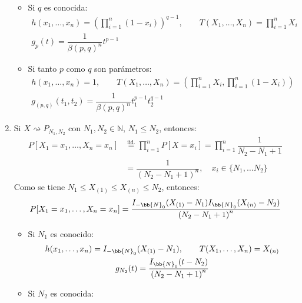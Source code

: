 \begin{ejercicio}
\begin{enumerate}[label=\alph*)]
\begin{itemize}
\begin{gather*}
                    \end{gather*}
                \item Si $q$ es conocida:
                    \begin{gather*}
                        h(x_1, \ldots, x_n) = {\left(\prod_{i=1}^{n}(1-x_i)\right)}^{q-1}, \qquad T(X_1, \ldots, X_n) = \prod_{i=1}^{n}X_i \\
                        g_p(t) = \dfrac{1}{{\beta(p,q)}^{n}} t^{p-1}
                    \end{gather*}
                \item Si tanto $p$ como $q$ son parámetros:
                    \begin{gather*}
                        h(x_1, \ldots, x_n) = 1, \qquad T(X_1, \ldots, X_n) = \left(\prod_{i=1}^{n}X_i, \prod_{i=1}^{n}(1-X_i)\right) \\
                        g_{(p,q)}(t_1, t_2) = \dfrac{1}{{\beta(p,q)}^{n}}t_1^{p-1}t_2^{q-1}
                    \end{gather*}
            \end{itemize}
        \item Si $X\rightsquigarrow P_{N_1,N_2}$ con $N_1,N_2\in \mathbb{N}$, $N_1\leq N_2$, entonces:
            \begin{align*}
                P[X_1=x_1, \ldots, X_n=x_n]&\stackrel{\text{iid.}}{=} \prod_{i=1}^{n} P[X=x_i] =\prod_{i=1}^{n} \dfrac{1}{N_2-N_1+1} \\
                                           &= \dfrac{1}{{(N_2-N_1+1)}^{n}}, \quad x_i \in \{N_1, \ldots N_2\} 
            \end{align*}
            Como se tiene $N_1\leq X_{(1)}\leq X_{(n)}\leq N_2$, entonces:
            \begin{equation*}
                P[X_1=x_1, \ldots, X_n=x_n] = \dfrac{I_{-\bb{N}_0}(X_{(1)}-N_1)I_{\bb{N}_0}(X_{(n)}-N_2)}{{(N_2-N_1+1)}^{n}}
            \end{equation*}
            \begin{itemize}
                \item Si $N_1$ es conocido:
                    \begin{gather*}
                        h(x_1, \ldots, x_n) = I_{-\bb{N}_0}(X_{(1)}-N_1), \qquad T(X_1, \ldots, X_n) = X_{(n)} \\
                        g_{N_2}(t) = \dfrac{I_{\bb{N}_0}(t-N_2)}{{(N_2-N_1+1)}^{n}}
                    \end{gather*}
                \item Si $N_2$ es conocida:

\end{itemize}
\end{enumerate}
\end{ejercicio}
